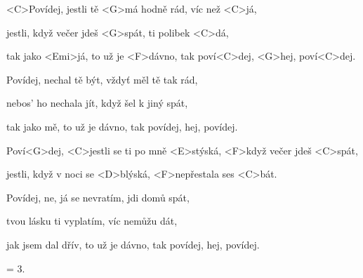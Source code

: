 

\zs
<C>Povídej, jestli tě <G>má hodně rád, víc než <C>já,

jestli, když večer jdeš <G>spát, ti polibek <C>dá,

tak jako <Emi>já, to už je <F>dávno, tak poví<C>dej, <G>hej, poví<C>dej.
\ks

\zs
Povídej, nechal tě být, vždyť měl tě tak rád,

nebos' ho nechala jít, když šel k jiný spát,

tak jako mě, to už je dávno, tak povídej, hej, povídej.
\ks

\zr
Poví<G>dej, <C>jestli se ti po mně <E>stýská, <F>když večer jdeš <C>spát,

jestli, když v noci se <D>blýská, <F>nepřestala ses <C>bát.
\kr

\zs
Povídej, ne, já se nevratím, jdi domů spát,

tvou lásku ti vyplatím, víc nemůžu dát,

jak jsem dal dřív, to už je dávno, tak povídej, hej, povídej.
\ks

\zr
\kr

\zs
= 3.
\ks

\kp
